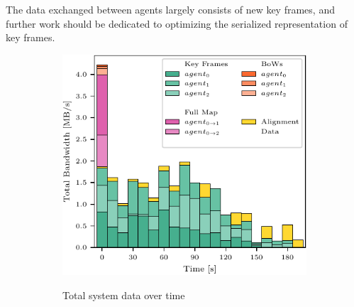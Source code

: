 The data exchanged between agents largely consists of new key frames, and further work should be dedicated to optimizing the serialized representation of key frames.

\begin{figure}[h]
    \centering
    \begin{subfigure}[b]{0.55\linewidth}
        \centering
         {
            \includegraphics[width=\linewidth, valign=t]{figures/apr11_mh_trajectory_b_bandwith.pdf}
        }
        \caption{Total system data over time}
    \end{subfigure}%
    ~
    \begin{subfigure}[b]{0.45\linewidth}
        \flushright
\end{subfigure}
\end{figure}
